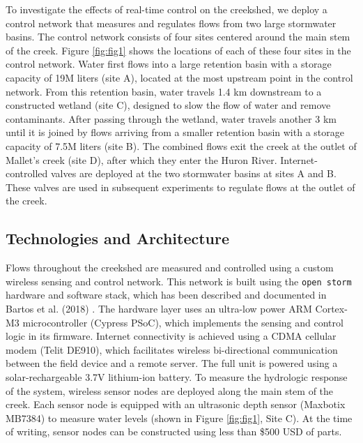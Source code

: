 To investigate the effects of real-time control on the creekshed, we deploy a control network that measures and regulates flows from two large stormwater basins. The control network consists of four sites centered around the main stem of the creek. Figure \ref{fig:fig1} shows the locations of each of these four sites in the control network. Water first flows into a large retention basin with a storage capacity of 19M liters (site A), located at the most upstream point in the control network. From this retention basin, water travels 1.4 km downstream to a constructed wetland (site C), designed to slow the flow of water and remove contaminants. After passing through the wetland, water travels another 3 km until it is joined by flows arriving from a smaller retention basin with a storage capacity of 7.5M liters (site B). The combined flows exit the creek at the outlet of Mallet's creek (site D), after which they enter the Huron River. Internet-controlled valves are deployed at the two stormwater basins at sites A and B. These valves are used in subsequent experiments to regulate flows at the outlet of the creek.

\subsection{Technologies and Architecture}

Flows throughout the creekshed are measured and controlled using a custom wireless sensing and control network. This network is built using the \texttt{open storm} hardware and software stack, which has been described and documented in Bartos et al. (2018) \cite{Bartos_2018}. The hardware layer uses an ultra-low power ARM Cortex-M3 microcontroller (Cypress PSoC), which implements the sensing and control logic in its firmware. Internet connectivity is achieved using a CDMA cellular modem (Telit DE910), which facilitates wireless bi-directional communication between the field device and a remote server. The full unit is powered using a solar-rechargeable 3.7V lithium-ion battery. To measure the hydrologic response of the system, wireless sensor nodes are deployed along the main stem of the creek. Each sensor node is equipped with an ultrasonic depth sensor (Maxbotix MB7384) to measure water levels (shown in Figure \ref{fig:fig1}, Site C). At the time of writing, sensor nodes can be constructed using less than \$500 USD of parts. %

